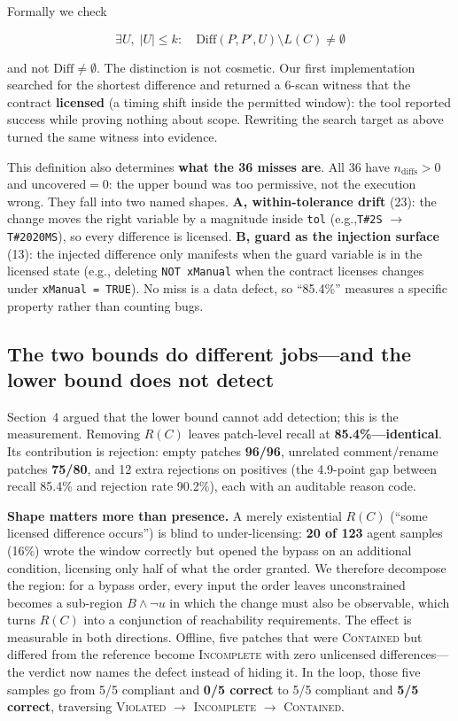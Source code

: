 \documentclass[acmsmall,screen,review,anonymous]{acmart}
\newcommand{\eg}{e.g.,\xspace}
\begin{document}
Formally we check

\begin{equation}
\exists U,\; |U| \le k:\quad \mathrm{Diff}(P,P',U)\setminus L(C)\neq\emptyset
\end{equation}

and not $\mathrm{Diff}\neq\emptyset$. The distinction is not cosmetic. Our first implementation searched for the shortest difference and returned a 6-scan witness that the contract \textbf{licensed} (a timing shift inside the permitted window): the tool reported success while proving nothing about scope. Rewriting the search target as above turned the same witness into evidence.

This definition also determines \textbf{what the 36 misses are}. All 36 have $n_{\mathrm{diffs}}>0$ and $\mathrm{uncovered}=0$: the upper bound was too permissive, not the execution wrong. They fall into two named shapes. \textbf{A, within-tolerance drift} (23): the change moves the right variable by a magnitude inside \texttt{tol} (\eg \texttt{T\#2S} $\to$ \texttt{T\#2020MS}), so every difference is licensed. \textbf{B, guard as the injection surface} (13): the injected difference only manifests when the guard variable is in the licensed state (\eg deleting \texttt{NOT xManual} when the contract licenses changes under \texttt{xManual = TRUE}). No miss is a data defect, so ``85.4\%'' measures a specific property rather than counting bugs.

\subsection{The two bounds do different jobs---and the lower bound does not detect}

Section~4 argued that the lower bound cannot add detection; this is the measurement. Removing $R(C)$ leaves patch-level recall at \textbf{85.4\%---identical}. Its contribution is rejection: empty patches \textbf{96/96}, unrelated comment/rename patches \textbf{75/80}, and 12 extra rejections on positives (the 4.9-point gap between recall 85.4\% and rejection rate 90.2\%), each with an auditable reason code.

\textbf{Shape matters more than presence.} A merely existential $R(C)$ (``some licensed difference occurs'') is blind to under-licensing: \textbf{20 of 123} agent samples (16\%) wrote the window correctly but opened the bypass on an additional condition, licensing only half of what the order granted. We therefore decompose the region: for a bypass order, every input the order leaves unconstrained becomes a sub-region $B\wedge\neg u$ in which the change must also be observable, which turns $R(C)$ into a conjunction of reachability requirements. The effect is measurable in both directions. Offline, five patches that were \textsc{Contained} but differed from the reference become \textsc{Incomplete} with zero unlicensed differences---the verdict now names the defect instead of hiding it. In the loop, those five samples go from 5/5 compliant and \textbf{0/5 correct} to 5/5 compliant and \textbf{5/5 correct}, traversing \textsc{Violated} $\to$ \textsc{Incomplete} $\to$ \textsc{Contained}.
\end{document}
